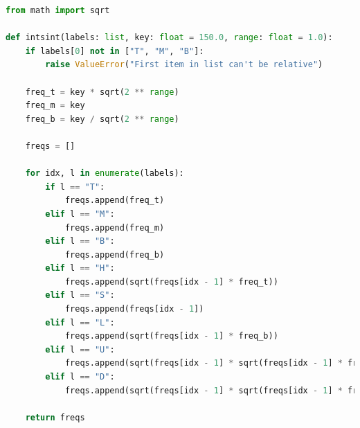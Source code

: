 \begin{lstlisting}[caption=Gerador de $ f_0 $ a partir do modelo INTSINT, label=intsintpy, language=Python]
from math import sqrt

def intsint(labels: list, key: float = 150.0, range: float = 1.0):
    if labels[0] not in ["T", "M", "B"]:
        raise ValueError("First item in list can't be relative")

    freq_t = key * sqrt(2 ** range)
    freq_m = key
    freq_b = key / sqrt(2 ** range)

    freqs = []

    for idx, l in enumerate(labels):
        if l == "T":
            freqs.append(freq_t)
        elif l == "M":
            freqs.append(freq_m)
        elif l == "B":
            freqs.append(freq_b)
        elif l == "H":
            freqs.append(sqrt(freqs[idx - 1] * freq_t))
        elif l == "S":
            freqs.append(freqs[idx - 1])
        elif l == "L":
            freqs.append(sqrt(freqs[idx - 1] * freq_b))
        elif l == "U":
            freqs.append(sqrt(freqs[idx - 1] * sqrt(freqs[idx - 1] * freq_t)))
        elif l == "D":
            freqs.append(sqrt(freqs[idx - 1] * sqrt(freqs[idx - 1] * freq_b)))

    return freqs
\end{lstlisting}
